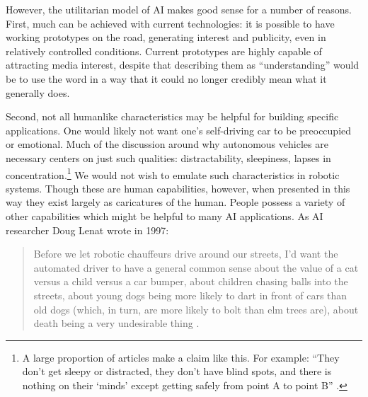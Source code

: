 


However, the utilitarian model of AI makes good sense for a number of reasons.
First, much can be achieved with current technologies:  it
is possible to have working prototypes on the road, generating
interest and publicity, even in relatively controlled conditions. Current
prototypes are highly capable of attracting media interest, despite
that describing them as 
``understanding'' would be to use the word in a way that it
could no longer credibly mean what it generally does. 

Second, not all humanlike characteristics may be helpful for building
specific applications. One would likely not want one's self-driving car
to be preoccupied or emotional. Much of the
discussion around why autonomous vehicles are necessary centers on
just such qualities: distractability, sleepiness, lapses in
concentration.\footnote{A large proportion of articles make a claim
  like this. For example: ``They don't get sleepy or
  distracted, they don't have blind spots, and there is nothing on
  their `minds' except getting safely from point A to point B'' \cite{merrill}.} We
would not wish to emulate such 
characteristics in robotic systems. Though these are human
capabilities, however, when presented in this way they exist largely as caricatures
of the human. People possess a
variety of other capabilities which might be helpful to many AI
applications. As AI researcher Doug Lenat wrote in 1997:
\begin{quote}
Before we let robotic chauffeurs drive around our streets, I'd want the
  automated driver to have a general common sense about the value of a
cat versus a child versus a car bumper, about children chasing balls
into the streets, about young dogs being more likely to dart in front
of cars than old dogs (which, in turn, are more likely to bolt than
elm trees are), about death being a very undesirable thing \cite[p.
  199]{lenat1997}.\end{quote} 

